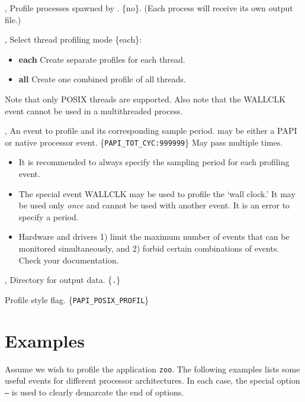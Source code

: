 \documentclass[english]{article}
\begin{document}
\begin{Description}
  \item[\OptoArg{-r}{yes \Bar no}, \OptoArg{--recursive}{yes \Bar no}] Profile processes spawned by .  \{no\}.  (Each process will receive its own output file.)
  \item[\OptArg{-t}{mode}, \OptArg{--threads}{mode}] Select thread profiling mode \{each\}:
  \begin{itemize}
    \item \textbf{each} Create separate profiles for each thread.
    \item \textbf{all} Create one combined profile of all threads.
  \end{itemize}
  Note that only POSIX threads are supported.
  Also note that the WALLCLK event cannot be used in a multithreaded process.
  \item[\OptArg{-e}{event\Lbr:period\Rbr}, \OptArg{--event}{event\Lbr:period\Rbr}]  An event to profile and its corresponding sample period.  may be either a PAPI or native processor event. \{\verb+PAPI_TOT_CYC:999999+\} May pass multiple times. 
  \begin{itemize}
    \item It is recommended to always specify the sampling period for each profiling event.
    \item The special event WALLCLK may be used to profile the `wall clock.'  It may be used only \emph{once} and cannot be used with another event. It is an error to specify a period.
    \item Hardware and drivers 1) limit the maximum number of events that can be monitored simultaneously, and 2) forbid certain combinations of events. Check your documentation.
  \end{itemize}
  \item[\OptoArg{-o}{outpath}, \OptoArg{--output}{outpath}] Directory for output data.  \{\texttt{.}\}
  \item[\OptArg{--papi-flag}{flag}] Profile style flag.  \{\verb+PAPI_POSIX_PROFIL+\}
\end{Description}


\section{Examples}

Assume we wish to profile the application \texttt{zoo}.
The following examples lists some useful events for different processor architectures.
In each case, the special option \texttt{--} is used to clearly demarcate the end of  options.
\end{document}
